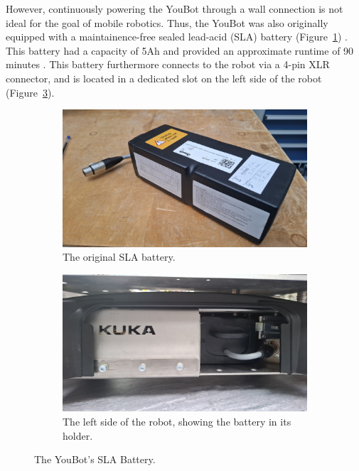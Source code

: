 \documentclass[a4paper, 12pt]{article}
\begin{document}
    However, continuously powering the YouBot through a wall connection is not ideal for the goal of mobile robotics. Thus, the YouBot was also originally equipped with a maintainence-free sealed lead-acid (SLA) battery (Figure~\ref{fig:youbot-battery}) . This battery had a capacity of 5Ah and provided an approximate runtime of 90 minutes \cite{YouBotSpecs2016}. This battery furthermore connects to the robot via a 4-pin XLR connector, and is located in a dedicated slot on the left side of the robot (Figure~\ref{fig:youbot-battery-holder}). %

    \begin{figure}[H]
        \centering
        \begin{subfigure}[t]{0.49\linewidth}
            \centering
            \includegraphics[width=\linewidth]{images/sec2/youbot_battery.jpg}
            \caption{The original SLA battery.}
            \label{fig:youbot-battery}
        \end{subfigure}
        \hfill
        \begin{subfigure}[t]{0.49\linewidth}
            \centering
            \includegraphics[width=\linewidth]{images/sec2/youbot_battery_holder.jpg}
            \caption{The left side of the robot, showing the battery in its holder.}
            \label{fig:youbot-battery-holder}
        \end{subfigure}
        \caption{The YouBot's SLA Battery.}
    \end{figure}
\end{document}
